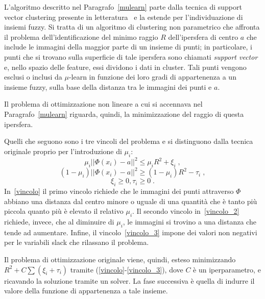\documentclass[12pt]{report}
\theoremstyle{definition}
\begin{document}
L'algoritmo descritto nel Paragrafo~\ref{mulearn} parte dalla tecnica di support vector clustering presente in letteratura~\cite{23} e la estende per l'individuazione di insiemi fuzzy. Si tratta di un algoritmo di clustering non parametrico che affronta il problema dell'identificazione del minimo raggio $R$ dell'ipersfera di centro $a$ che include le immagini della maggior parte di un insieme di punti; in particolare, i punti che si trovano sulla superficie di tale ipersfera sono chiamati \textit{support vector} e, nello spazio delle feature, essi dividono i dati in cluster.
Tali punti vengono esclusi o inclusi da $\mu$-learn in funzione dei loro gradi di appartenenza a un insieme fuzzy, sulla base della distanza tra le immagini dei punti e $a$.

Il problema di ottimizzazione non lineare a cui si accennava nel Paragrafo~\ref{mulearn} riguarda, quindi, la minimizzazione del raggio di questa ipersfera.

Quelli che seguono sono i tre vincoli del problema e si distinguono dalla tecnica originale proprio per l'introduzione di $\mu_i$:
\begin{equation}\label{vincolo}
    \mu_i || \mathit{\Phi}(x_i) - a ||^2 \leq \mu_iR^2 + \xi_i \;,
\end{equation}
\begin{equation}\label{vincolo_2}
    (1 - \mu_i) || \mathit{\Phi}(x_i) - a ||^2 \geq (1 - \mu_i)R^2 - \tau_i \;,
\end{equation}
\begin{equation}\label{vincolo_3}
    \xi_i \geq 0, \tau_i \geq 0 \;.
\end{equation}
In~\ref{vincolo} il primo vincolo richiede che le immagini dei punti attraverso $\mathit{\Phi}$ abbiano una distanza dal centro minore o uguale di una quantità che è tanto più piccola quanto più è elevato il relativo $\mu_i$. Il secondo vincolo in~\ref{vincolo_2} richiede, invece, che al diminuire di $\mu_i$, le immagini si trovino a una distanza che tende ad aumentare. Infine, il vincolo~\ref{vincolo_3} impone dei valori non negativi per le variabili slack che rilassano il problema.

Il problema di ottimizzazione originale viene, quindi, esteso minimizzando $R^2 + C\sum(\xi_i + \tau_i)$ tramite (\ref{vincolo}-\ref{vincolo_3}), dove $C$ è un iperparametro, e ricavando la soluzione tramite un solver.
La fase successiva è quella di indurre il valore della funzione di appartenenza a tale insieme.
\end{document}
